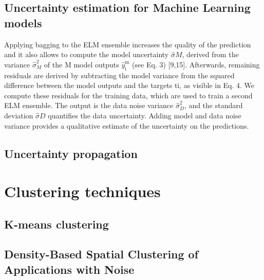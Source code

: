 
\subsection{Uncertainty estimation for Machine Learning models}

Applying bagging to the ELM ensemble increases the quality of the prediction and it also allows to compute the model uncertainty $\hat{\sigma}M$, derived from the variance ${\hat{\sigma}}_M^2$ of the M model outputs ${\hat{y}}_\mathrm{i}^\mathrm{m}$ (see Eq. 3) [9,15]. Afterwards, remaining residuals are derived by subtracting the model variance from the squared difference between the model outputs and the targets ti, as visible in Eq. 4. We compute these residuals for the training data, which are used to train a second ELM ensemble. The output is the data noise variance ${\hat{\sigma}}_D^2$, and the standard deviation $\hat{\sigma}D$ quantifies the data uncertainty. Adding model and data noise variance provides a qualitative estimate of the uncertainty on the predictions.

\subsection{Uncertainty propagation}

    
\section{Clustering techniques}
\subsection{K-means clustering}
\subsection{Density-Based Spatial Clustering of Applications with Noise}

